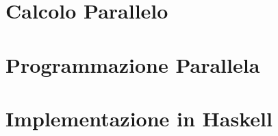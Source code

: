 \documentclass[oneside, 12pt, a4paper]{book}
\begin{document}


\part{Calcolo Parallelo}




\part{Programmazione Parallela}




\part{Implementazione in Haskell}


\printbibliography[title=Bibliografia]
\end{document}
